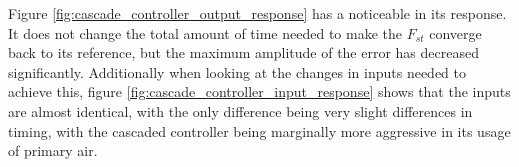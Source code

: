 Figure \ref{fig:cascade_controller_output_response} has a noticeable in its response. It does not change the total amount of time needed to make the $F_{st}$ converge back to its reference, but the maximum amplitude of the error has decreased significantly. Additionally when looking at the changes in inputs needed to achieve this, figure \ref{fig:cascade_controller_input_response} shows that the inputs are almost identical, with the only difference being very slight differences in timing, with the cascaded controller being marginally more aggressive in its usage of primary air. 



